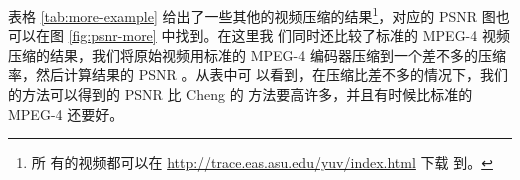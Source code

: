 表格 \ref{tab:more-example} 给出了一些其他的视频压缩的结果\footnote{所
  有的视频都可以在 \url{http://trace.eas.asu.edu/yuv/index.html} 下载
  到。}，对应的 PSNR 图也可以在图 \ref{fig:psnr-more} 中找到。在这里我
们同时还比较了标准的 MPEG-4 视频压缩的结果，我们将原始视频用标准的
MPEG-4 编码器压缩到一个差不多的压缩率，然后计算结果的 PSNR 。从表中可
以看到，在压缩比差不多的情况下，我们的方法可以得到的 PSNR 比 Cheng 的
方法要高许多，并且有时候比标准的 MPEG-4 还要好。

\begin{figure}[t]
  \centering

\end{figure}
